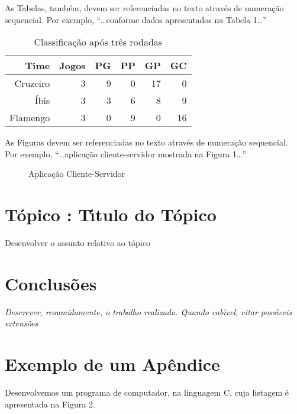 \documentclass[a4paper,11pt]{article}
\begin{document}
As Tabelas, tamb{\'e}m, devem ser referenciadas no texto atrav{\'e}s de numera{\c c}{\~a}o sequencial. Por exemplo, ``\ldots{}conforme dados apresentados na Tabela 1{}\ldots''
\begin{table}[H]
  \centering
  \begin{tabular}{|r|r|r|r|r|r|}
    \hline
        Time &    Jogos &       PG &       PP &       GP &       GC \\
    \hline\hline
    Cruzeiro &        3 &        9 &        0 &       17 &        0 \\
        {\'I}bis &        3 &        3 &        6 &        8 &        9 \\
    Flamengo &        3 &        0 &        9 &        0 &       16 \\
    \hline
  \end{tabular}
  \caption{Classifica{\c c}{\~a}o ap{\'o}s tr{\^e}s rodadas}
\end{table}

As Figuras devem ser referenciadas no texto atrav{\'e}s de numera{\c c}{\~a}o sequencial. Por exemplo, ``\ldots{}aplica{\c c}{\~a}o cliente-servidor mostrada na Figura 1{}\ldots''
\begin{figure}[H]
        \centering
        \caption{Aplica{\c c}{\~a}o Cliente-Servidor}
\end{figure}
\section{T{\'o}pico : T{\'\i}tulo do T{\'o}pico}
Desenvolver o assunto relativo ao t{\'o}pico
\section{Conclus{\~o}es}
{\it Descrever, resumidamente, o trabalho realizado. Quando cab{\'\i}vel, citar poss{\'\i}veis extens{\~o}es}
\pagebreak


\appendix
\section{Exemplo de um Ap{\^e}ndice}
Desenvolvemos um programa de computador, na linguagem C, cuja listagem {\'e} apresentada na Figura 2.
\end{document}
